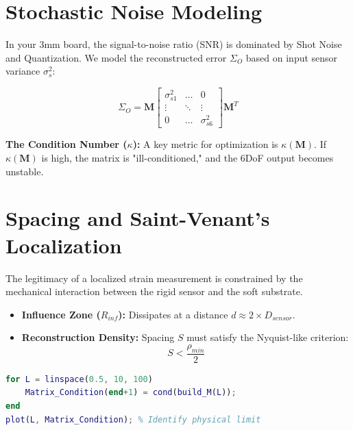 \documentclass{article}
\begin{document}
\section{Stochastic Noise Modeling}
In your 3mm board, the signal-to-noise ratio (SNR) is dominated by Shot Noise and Quantization. We model the reconstructed error $\Sigma_{O}$ based on input sensor variance $\sigma_s^2$:

\begin{equation}
\Sigma_{O} = \mathbf{M} \begin{bmatrix} \sigma_{s1}^2 & \dots & 0 \\ \vdots & \ddots & \vdots \\ 0 & \dots & \sigma_{s6}^2 \end{bmatrix} \mathbf{M}^T
\end{equation}

\textbf{The Condition Number ($\kappa$):}
A key metric for optimization is $\kappa(\mathbf{M})$. If $\kappa(\mathbf{M})$ is high, the matrix is "ill-conditioned," and the 6DoF output becomes unstable.

\section{Spacing and Saint-Venant’s Localization}
The legitimacy of a localized strain measurement is constrained by the mechanical interaction between the rigid sensor and the soft substrate.

\begin{itemize}
    \item \textbf{Influence Zone ($R_{inf}$):} Dissipates at a distance $d \approx 2 \times D_{sensor}$.
    \item \textbf{Reconstruction Density:} Spacing $S$ must satisfy the Nyquist-like criterion:
    \begin{equation}
    S < \frac{\rho_{min}}{2}
    \end{equation}
\end{itemize}

\begin{lstlisting}[language=Matlab, caption=Condition Number Optimization]
% Loop to find the "Knee" of the error curve
for L = linspace(0.5, 10, 100)
    Matrix_Condition(end+1) = cond(build_M(L)); 
end
plot(L, Matrix_Condition); % Identify physical limit
\end{lstlisting}
\end{document}
